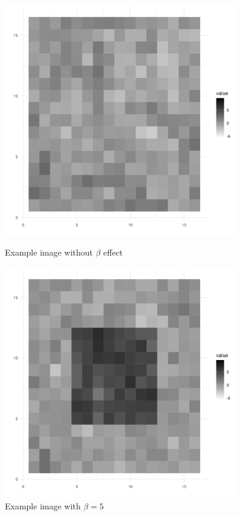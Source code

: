 \documentclass[12pt]{article}
\begin{document}
\begin{figure}[H]
    \centering
    \begin{minipage}{0.45\textwidth}
        \centering
        \includegraphics[width=0.9\textwidth]{../Figures/ex_image_5c.png}
        \caption{Example image without \(\beta\) effect}
        \label{fig:image1}
    \end{minipage}\hfill
    \begin{minipage}{0.45\textwidth}
        \centering
        \includegraphics[width=0.9\textwidth]{../Figures/ex_image_5.png}
        \caption{Example image with \(\beta = 5\)}
        \label{fig:image2}
    \end{minipage}


\end{figure}
\end{document}
